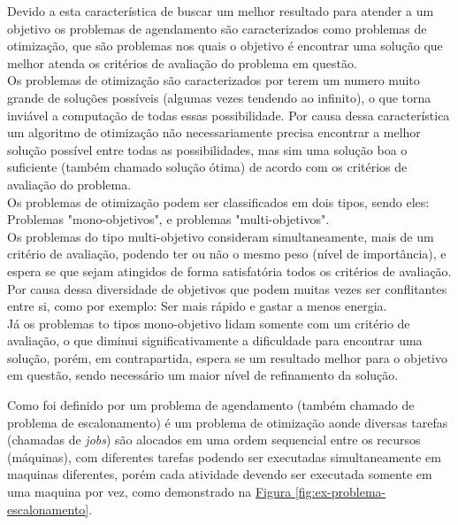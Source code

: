 Devido a esta característica de buscar um melhor resultado para atender a um objetivo os problemas de agendamento são caracterizados como problemas de otimização, que são problemas nos quais o objetivo é encontrar uma solução que melhor atenda os critérios de avaliação do problema em questão.\\
%
\indent Os problemas de otimização são caracterizados por terem um numero muito grande de soluções possíveis (algumas vezes tendendo ao infinito), o que torna inviável a computação de todas essas possibilidade. Por causa dessa característica um algoritmo de otimização não necessariamente precisa encontrar a melhor solução possível entre todas as possibilidades, mas sim uma solução boa o suficiente (também chamado solução ótima) de acordo com os critérios de avaliação do problema.\\
%
Os problemas de otimização podem ser classificados em dois tipos, sendo eles: Problemas "mono-objetivos", e problemas "multi-objetivos".\\
%
Os problemas do tipo multi-objetivo consideram simultaneamente, mais de um critério de avaliação, podendo ter ou não o mesmo peso (nível de importância), e espera se que sejam atingidos de forma satisfatória todos os critérios de avaliação. Por causa dessa diversidade de objetivos que podem muitas vezes ser conflitantes entre si, como por exemplo: Ser mais rápido e gastar a menos energia.\\
%
Já os problemas to tipos mono-objetivo lidam somente com um critério de avaliação, o que diminui significativamente a dificuldade para encontrar uma solução, porém, em contrapartida, espera se um resultado melhor para o objetivo em questão, sendo necessário um maior nível de refinamento da solução.

Como foi definido por \cite{Bagchi1999} um problema de agendamento (também chamado de problema de escalonamento) é um problema de otimização aonde 
diversas tarefas (chamadas de \textit{jobs}) são alocados em uma ordem sequencial entre os recursos (máquinas), 
com diferentes tarefas podendo ser executadas simultaneamente
em maquinas diferentes, porém cada atividade devendo ser executada somente em uma maquina por vez, como demonstrado na
\hyperref[fig:ex-problema-escalonamento]{Figura \ref{fig:ex-problema-escalonamento}}.\\

